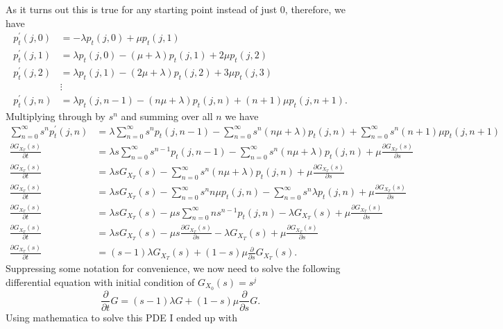 \documentclass[10pt]{amsart}
\begin{document}
As it turns out this is true for any starting point instead of just 0, therefore, we have
\begin{align*}
p^\prime_t(j,0) &= -\lambda p_t(j,0) + \mu p_t(j,1) \\
p^\prime_t(j,1) &= \lambda p_t(j,0) - (\mu + \lambda) p_t(j,1) + 2\mu p_t(j,2) \\
p^\prime_t(j,2) &= \lambda p_t(j,1) - (2\mu + \lambda) p_t(j,2) + 3\mu p_t(j,3) \\
& \vdots \\
p^\prime_t(j,n) &= \lambda p_t(j,n-1) - (n\mu + \lambda) p_t(j,n) + (n + 1)\mu p_t(j,n+1).
\end{align*}
Multiplying through by $s^n$ and summing over all $n$ we have
\begin{align*}
\sum_{n=0}^\infty s^n p^\prime_t(j,n)
	&= \lambda \sum_{n=0}^\infty s^n p_t(j,n-1) - \sum_{n=0}^\infty s^n  (n\mu + \lambda) p_t(j,n) + \sum_{n=0}^\infty s^n (n + 1)\mu p_t(j,n+1) \\
\frac {\partial G_{X_T}(s)}{\partial t}
	&= \lambda s \sum_{n=0}^\infty s^{n - 1} p_t(j,n-1) - \sum_{n=0}^\infty s^n  (n\mu + \lambda) p_t(j,n) + \mu \frac {\partial G_{X_T}(s)}{\partial s} \\
\frac {\partial G_{X_T}(s)}{\partial t}
	&= \lambda s G_{X_T}(s) - \sum_{n=0}^\infty s^n  (n\mu + \lambda) p_t(j,n) + \mu \frac {\partial G_{X_T}(s)}{\partial s} \\
\frac {\partial G_{X_T}(s)}{\partial t}
	&= \lambda s G_{X_T}(s) - \sum_{n=0}^\infty s^n n\mu p_t(j,n) - \sum_{n=0}^\infty s^n \lambda p_t(j,n) + \mu \frac {\partial G_{X_T}(s)}{\partial s} \\
\frac {\partial G_{X_T}(s)}{\partial t}
	&= \lambda s G_{X_T}(s) - \mu s \sum_{n=0}^\infty ns^{n-1} p_t(j,n) - \lambda G_{X_T}(s) + \mu \frac {\partial G_{X_T}(s)}{\partial s} \\
\frac {\partial G_{X_T}(s)}{\partial t}
	&= \lambda s G_{X_T}(s) - \mu s \frac {\partial G_{X_T}(s)}{\partial s} - \lambda G_{X_T}(s) + \mu \frac {\partial G_{X_T}(s)}{\partial s} \\
\frac {\partial G_{X_T}(s)}{\partial t}
	&= (s - 1) \lambda G_{X_T}(s) + (1 - s)\mu \frac {\partial }{\partial s}G_{X_T}(s).
\end{align*}
Suppressing some notation for convenience, we now need to solve the following differential equation with initial condition of $G_{X_0}(s) = s^j$
$$
\frac {\partial}{\partial t} G
	= (s - 1) \lambda G + (1 - s)\mu \frac {\partial }{\partial s}G.
$$
Using mathematica to solve this PDE I ended up with
\end{document}
